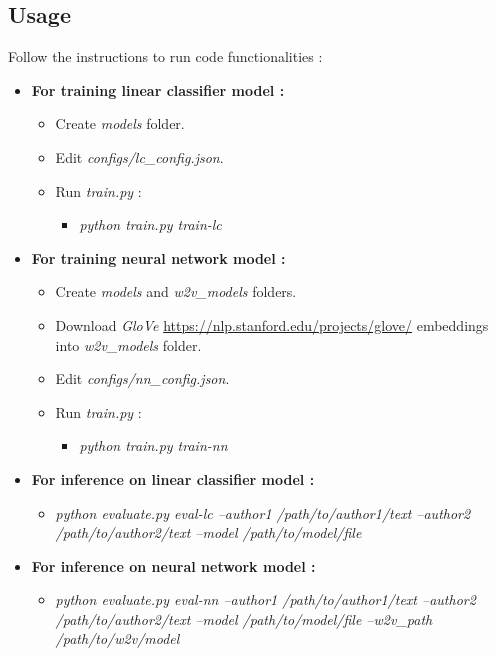 \documentclass[letterpaper, 10 pt, conference]{ieeeconf}  %
\newcommand{\link}[1]{{\color{blue}\href{#1}{#1}}}
\begin{document}
\subsection{Usage}
Follow the instructions to run code functionalities :
\begin{itemize}
    \item \textbf{For training linear classifier model :}
    \begin{itemize}
        \item Create \emph{models} folder.
        \item Edit \emph{configs/lc\_config.json}.
        \item Run \emph{train.py} :
        \begin{itemize}
            \item \emph{python train.py train-lc}
        \end{itemize}
    \end{itemize}
    \item \textbf{For training neural network model :}
    \begin{itemize}
        \item Create \emph{models} and \emph{w2v\_models} folders.
        \item Download \emph{GloVe} \link{https://nlp.stanford.edu/projects/glove/} embeddings into \emph{w2v\_models} folder.
        \item Edit \emph{configs/nn\_config.json}.
        \item Run \emph{train.py} :
        \begin{itemize}
            \item \emph{python train.py train-nn}
        \end{itemize}
    \end{itemize}
    \item \textbf{For inference on linear classifier model :}
    \begin{itemize}
        \item \emph{python evaluate.py eval-lc --author1 /path/to/author1/text --author2 /path/to/author2/text --model /path/to/model/file}
    \end{itemize}
    \item \textbf{For inference on neural network model :}
    \begin{itemize}
        \item \emph{python evaluate.py eval-nn --author1 /path/to/author1/text --author2 /path/to/author2/text --model /path/to/model/file --w2v\_path /path/to/w2v/model}
    \end{itemize}
\end{itemize}
\end{document}
